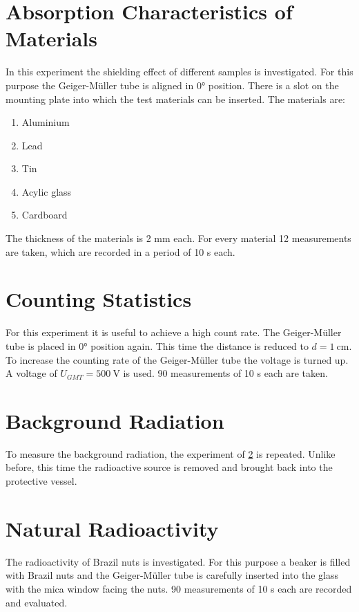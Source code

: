 \section{Absorption Characteristics of Materials}
In this experiment the shielding effect of different samples is investigated. For this purpose the Geiger-Müller tube is aligned in 0° position. There is a slot on the mounting plate into which the test materials can be inserted. The materials are:
\begin{enumerate}
	\item Aluminium
	\item Lead
	\item Tin
	\item Acylic glass
	\item Cardboard
\end{enumerate}
The thickness of the materials is 2 mm each. For every material 12 measurements are taken, which are recorded in a period of 10 s each.
%
\section{Counting Statistics} \label{sec:count_stat}
For this experiment it is useful to achieve a high count rate. The Geiger-Müller tube is placed in 0° position again. This time the distance is reduced to $d = 1\ \mathrm{cm}$. To increase the counting rate of the Geiger-Müller tube the voltage is turned up. A voltage of $U_{GMT} = 500\ \mathrm{V}$ is used. 90 measurements of 10 s each are taken.
%
\section{Background Radiation}
To measure the background radiation, the experiment of \ref{sec:count_stat} is repeated. Unlike before, this time the radioactive source is removed and brought back into the protective vessel.
%
\section{Natural Radioactivity}
%
The radioactivity of Brazil nuts is investigated. For this purpose a beaker is filled with Brazil nuts and the Geiger-Müller tube is carefully inserted into the glass with the mica window facing the nuts. 90 measurements of 10 s each are recorded and evaluated.
